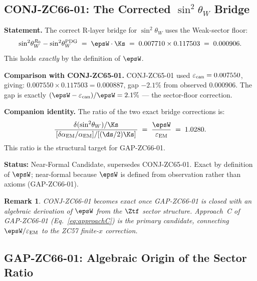 \documentclass[12pt, a4paper]{article}
\newtheorem*{remark}{Remark}
\renewcommand{\epsEM}{\varepsilon_{\rm EM}}
\renewcommand{\epscan}{\varepsilon_{\rm can}}
\renewcommand{\swsq}{\sin^2\!\theta_W}
\renewcommand{\aEM}{\alpha_{\rm EM}}
\begin{document}
\subsection{CONJ-ZC66-01: The Corrected $\swsq$ Bridge}
\label{sec:conj}

\begin{derivedbox}[title={CONJ-ZC66-01: $\delta(\swsq) = \epsW\cdot\Ks$
  (Supersedes CONJ-ZC65-01)}]
\textbf{Statement.}
The correct R-layer bridge for $\swsq$ uses the Weak-sector
floor:
\begin{equation}
  \swsq^{R_0} - \swsq^{\rm PDG}
  \;=\;
  \epsW\cdot\Ks
  \;=\; 0.007710 \times 0.117503
  \;=\; 0.000906.
  \label{eq:swbridge}
\end{equation}
This holds \emph{exactly} by the definition of $\epsW$.

\textbf{Comparison with CONJ-ZC65-01.}
CONJ-ZC65-01 used $\epscan = 0.007550$, giving:
$0.007550 \times 0.117503 = 0.000887$, gap $-2.1\%$ from
observed $0.000906$.
The gap is exactly $(\epsW - \epscan)/\epsW = 2.1\%$
--- the sector-floor correction.

\textbf{Companion identity.}
The ratio of the two exact bridge corrections is:
\[
  \frac{\delta(\swsq)/\Ks}{\,[\delta\aEM/\aEM] / [(\ds/2)\Ks]\,}
  \;=\; \frac{\epsW}{\epsEM} \;=\; 1.0280.
\]
This ratio is the structural target for GAP-ZC66-01.

\textbf{Status:} Near-Formal Candidate, supersedes CONJ-ZC65-01.
Exact by definition of $\epsW$; near-formal because $\epsW$
is defined from observation rather than axioms (GAP-ZC66-01).
\end{derivedbox}

\begin{remark}
CONJ-ZC66-01 becomes exact once GAP-ZC66-01 is closed with an
algebraic derivation of $\epsW$ from the $\Ztf$ sector structure.
Approach~C of GAP-ZC66-01 (Eq.~\eqref{eq:approachC}) is the
primary candidate, connecting $\epsW/\epsEM$ to the ZC57
finite-$x$ correction.
\end{remark}

\subsection{GAP-ZC66-01: Algebraic Origin of the Sector Ratio}
\label{sec:gap}
\end{document}

